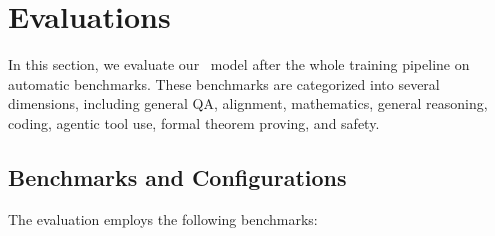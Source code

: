 \section{Evaluations}
In this section, we evaluate our~{\longcatthink} model after the whole training pipeline on automatic benchmarks.
These benchmarks are categorized into several dimensions, including general QA, alignment, mathematics, general reasoning, coding, agentic tool use, formal theorem proving, and safety.

% 


\subsection{Benchmarks and Configurations}
The evaluation employs the following benchmarks:
